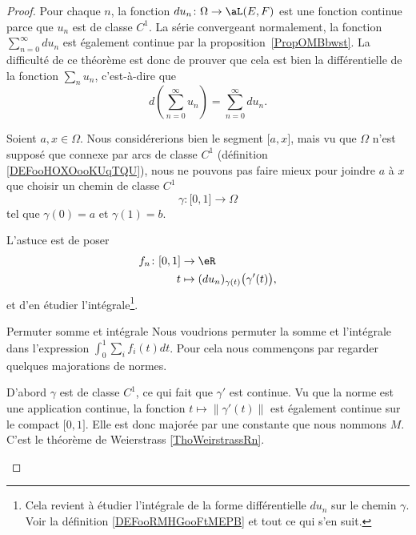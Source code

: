\begin{proof}
    Pour chaque \( n\), la fonction \( du_n\colon \Omega\to \aL(E,F)\) est une fonction continue parce que \( u_n\) est de classe \( C^1\). La série convergeant normalement, la fonction \( \sum_{n=0}^{\infty}du_n\) est également continue par la proposition~\ref{PropOMBbwst}. La difficulté de ce théorème est donc de prouver que cela est bien la différentielle de la fonction \( \sum_nu_n\), c'est-à-dire que
    \begin{equation}
        d\left( \sum_{n=0}^{\infty}u_n \right)=\sum_{n=0}^{\infty}du_n.
    \end{equation}

    Soient \( a,x\in \Omega\). Nous considérerions bien le segment \( \mathopen[ a , x \mathclose]\), mais vu que \( \Omega\) n'est supposé que connexe par arcs de classe \( C^1\) (définition \ref{DEFooHOXOooKUqTQU}), nous ne pouvons pas faire mieux pour joindre \( a\) à \( x\) que choisir un chemin de classe \( C^1\)
    \begin{equation}
        \gamma\colon \mathopen[ 0 , 1 \mathclose]\to \Omega
    \end{equation}
    tel que \( \gamma(0)=a\) et \( \gamma(1)=b\).

    L'astuce est de poser
    \begin{equation}
        \begin{aligned}
            f_n\colon \mathopen[ 0 , 1 \mathclose]&\to \eR \\
            t&\mapsto (du_n)_{\gamma(t)}\big( \gamma'(t) \big),
        \end{aligned}
    \end{equation}
    et d'en étudier l'intégrale\footnote{Cela revient à étudier l'intégrale de la forme différentielle \( du_n\) sur le chemin \( \gamma\). Voir la définition \ref{DEFooRMHGooFtMEPB} et tout ce qui s'en suit.}.

    \begin{subproof}
        \item[Permuter somme et intégrale]
            Nous voudrions permuter la somme et l'intégrale dans l'expression \( \int_0^1\sum_if_i(t)dt\). Pour cela nous commençons par regarder quelques majorations de normes.

            D'abord \( \gamma\) est de classe \( C^1\), ce qui fait que \( \gamma'\) est continue. Vu que la norme est une application continue, la fonction \( t\mapsto \| \gamma'(t) \|\) est également continue sur le compact \( \mathopen[ 0 , 1 \mathclose]\). Elle est donc majorée par une constante que nous nommons \( M\). C'est le théorème de Weierstrass \ref{ThoWeirstrassRn}.


\end{subproof}
\end{proof}
